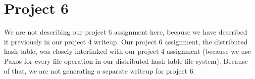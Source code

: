 \documentclass[11pt]{article}
\begin{document}
\section{Project 6}

We are not describing our project 6 assignment here, because we have described it previously in our project 4 writeup. Our project 6 assignment, the distributed hash table, was closely interlinked with our project 4 assignment (because we use Paxos for every file operation in our distributed hash table file system). Because of that, we are not generating a separate writeup for project 6.
\end{document}
